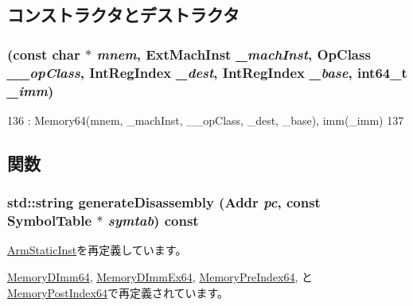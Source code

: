 \subsection{コンストラクタとデストラクタ}
\hypertarget{classArmISA_1_1MemoryImm64_a0212f5a4085b707ee10f07f63f903594}{
\subsubsection[{MemoryImm64}]{ (const char $\ast$ {\em mnem}, \/  {\bf ExtMachInst} {\em \_\-machInst}, \/  OpClass {\em \_\-\_\-opClass}, \/  {\bf IntRegIndex} {\em \_\-dest}, \/  {\bf IntRegIndex} {\em \_\-base}, \/  int64\_\-t {\em \_\-imm})}}
\label{classArmISA_1_1MemoryImm64_a0212f5a4085b707ee10f07f63f903594}



\begin{DoxyCode}
136         : Memory64(mnem, _machInst, __opClass, _dest, _base), imm(_imm)
137     {}
\end{DoxyCode}


\subsection{関数}
\hypertarget{classArmISA_1_1MemoryImm64_a95d323a22a5f07e14d6b4c9385a91896}{
\subsubsection[{generateDisassembly}]{\setlength{\rightskip}{0pt plus 5cm}std::string generateDisassembly ({\bf Addr} {\em pc}, \/  const SymbolTable $\ast$ {\em symtab}) const}}
\label{classArmISA_1_1MemoryImm64_a95d323a22a5f07e14d6b4c9385a91896}


\hyperlink{classArmISA_1_1ArmStaticInst_a95d323a22a5f07e14d6b4c9385a91896}{ArmStaticInst}を再定義しています。

\hyperlink{classArmISA_1_1MemoryDImm64_a95d323a22a5f07e14d6b4c9385a91896}{MemoryDImm64}, \hyperlink{classArmISA_1_1MemoryDImmEx64_a95d323a22a5f07e14d6b4c9385a91896}{MemoryDImmEx64}, \hyperlink{classArmISA_1_1MemoryPreIndex64_a95d323a22a5f07e14d6b4c9385a91896}{MemoryPreIndex64}, と \hyperlink{classArmISA_1_1MemoryPostIndex64_a95d323a22a5f07e14d6b4c9385a91896}{MemoryPostIndex64}で再定義されています。


